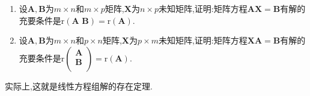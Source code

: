 \documentclass[../../main.tex]{subfiles}
\begin{document}
\begin{theorem}[线性方程组有解的充要条件]\label{theorem:线性方程组有解的充要条件}
\begin{enumerate}
\item 设\(\boldsymbol{A},\boldsymbol{B}\)为\(m\times n\)和\(m\times p\)矩阵,\(\boldsymbol{X}\)为\(n\times p\)未知矩阵,证明:矩阵方程\(\boldsymbol{A}\boldsymbol{X}=\boldsymbol{B}\)有解的充要条件是\(\mathrm{r}\left( \boldsymbol{A}\,\,\boldsymbol{B} \right)=\mathrm{r}(\boldsymbol{A})\).

\item 设\(\boldsymbol{A},\boldsymbol{B}\)为\(m\times n\)和\(p\times n\)矩阵,\(\boldsymbol{X}\)为\(p\times m\)未知矩阵,证明:矩阵方程\(\boldsymbol{X}\boldsymbol{A}=\boldsymbol{B}\)有解的充要条件是\(\mathrm{r}\left( \begin{array}{c}
\boldsymbol{A}\\
\boldsymbol{B}\\
\end{array} \right) =\mathrm{r}\left( \boldsymbol{A} \right) \).
\end{enumerate}
\end{theorem}
\begin{note}
实际上,这就是线性方程组解的存在定理.
\end{note}
\end{document}
